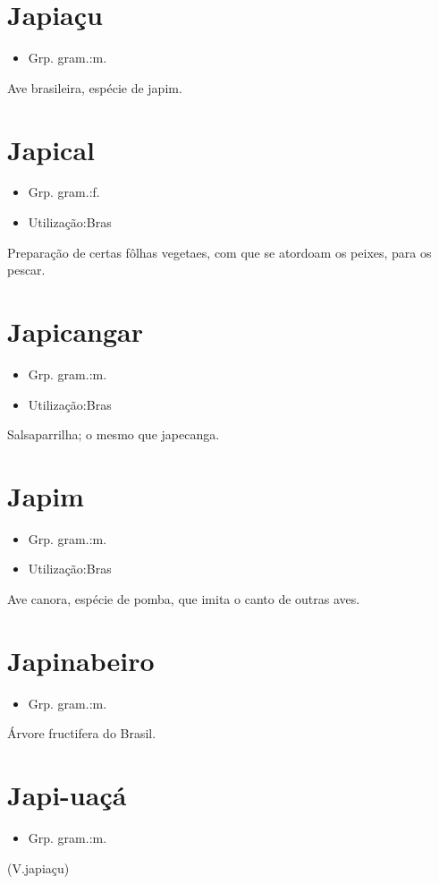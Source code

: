 \documentclass{article}
\begin{document}
\section{Japiaçu}
\begin{itemize}
\item {Grp. gram.:m.}
\end{itemize}
Ave brasileira, espécie de japim.
\section{Japical}
\begin{itemize}
\item {Grp. gram.:f.}
\end{itemize}
\begin{itemize}
\item {Utilização:Bras}
\end{itemize}
Preparação de certas fôlhas vegetaes, com que se atordoam os peixes, para os pescar.
\section{Japicangar}
\begin{itemize}
\item {Grp. gram.:m.}
\end{itemize}
\begin{itemize}
\item {Utilização:Bras}
\end{itemize}
Salsaparrilha; o mesmo que \textunderscore japecanga\textunderscore .
\section{Japim}
\begin{itemize}
\item {Grp. gram.:m.}
\end{itemize}
\begin{itemize}
\item {Utilização:Bras}
\end{itemize}
Ave canora, espécie de pomba, que imita o canto de outras aves.
\section{Japinabeiro}
\begin{itemize}
\item {Grp. gram.:m.}
\end{itemize}
Árvore fructifera do Brasil.
\section{Japi-uaçá}
\begin{itemize}
\item {Grp. gram.:m.}
\end{itemize}
(V.japiaçu)
\end{document}
